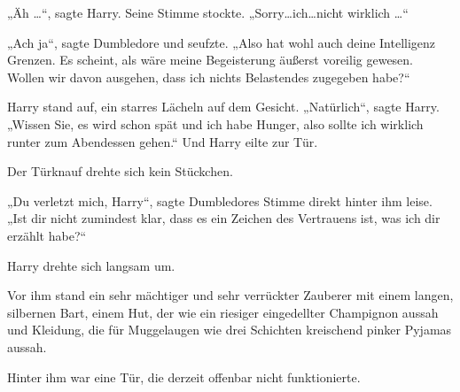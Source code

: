 „Äh …“, sagte Harry. Seine Stimme stockte. „Sorry…ich…nicht wirklich …“

„Ach ja“, sagte Dumbledore und seufzte. „Also hat wohl auch deine Intelligenz Grenzen. Es scheint, als wäre meine Begeisterung äußerst voreilig gewesen. Wollen wir davon ausgehen, dass ich nichts Belastendes zugegeben habe?“

Harry stand auf, ein starres Lächeln auf dem Gesicht. „Natürlich“, sagte Harry. „Wissen Sie, es wird schon spät und ich habe Hunger, also sollte ich wirklich runter zum Abendessen gehen.“ Und Harry eilte zur Tür.

Der Türknauf drehte sich kein Stückchen.

„Du verletzt mich, Harry“, sagte Dumbledores Stimme direkt hinter ihm leise. „Ist dir nicht zumindest klar, dass es ein Zeichen des Vertrauens ist, was ich dir erzählt habe?“

Harry drehte sich langsam um.

Vor ihm stand ein sehr mächtiger und sehr verrückter Zauberer mit einem langen, silbernen Bart, einem Hut, der wie ein riesiger eingedellter Champignon aussah und Kleidung, die für Muggelaugen wie drei Schichten kreischend pinker Pyjamas aussah.

Hinter ihm war eine Tür, die derzeit offenbar nicht funktionierte.

